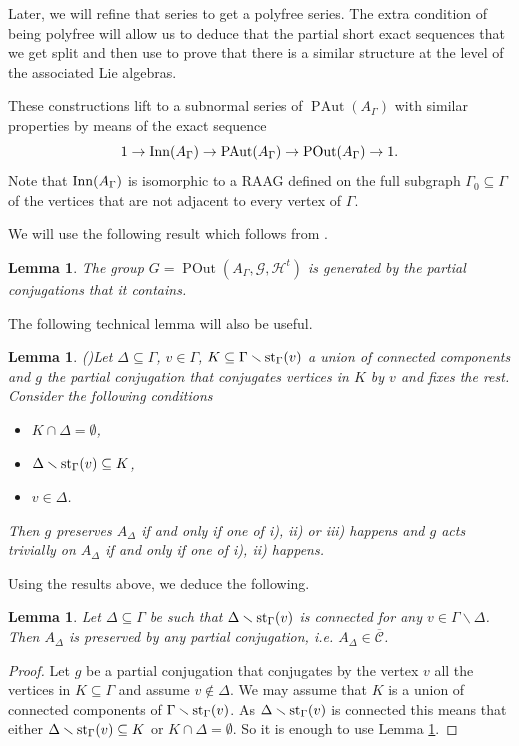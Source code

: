\documentclass[10pt]{amsart}
\newtheorem{lemma}[theorem]{Lemma}
\theoremstyle{definition}
\newcommand{\Inn}{{\rm Inn}}
\newcommand{\st}{{\rm st}}
\newcommand{\PAut}{\operatorname{PAut}}
\newcommand{\POut}{\operatorname {POut}}
\theoremstyle{definition}
\numberwithin{equation}{section}
\begin{document}
  Later, we will refine that series to get a polyfree series. The extra condition of being polyfree will allow us to deduce that the partial short exact sequences that we get split and then use \cite{FalkRandell} to prove that there is a similar structure at the level of the associated Lie algebras.
  
  These constructions lift to a subnormal series of $\PAut(A_\Gamma)$ with similar properties by means of the exact sequence
  \[ 1 \to \Inn(A_\Gamma) \to \PAut(A_\Gamma) \to \POut(A_\Gamma) \to 1.\]
  Note that $\Inn(A_\Gamma)$ is isomorphic to a RAAG defined on the full subgraph $\Gamma_0 \subseteq \Gamma$ of the vertices that are not adjacent to every vertex of $\Gamma$.



  We will use the following result which follows from \cite[Theorem D]{DayWade}.
  
  \begin{lemma}\label{lem:generating} The group $G=\POut(A_\Gamma,\mathcal{G},\mathcal{H}^t)$ is generated by the partial conjugations that it contains.
   \end{lemma}
   
   The following technical lemma will also be useful.
   
   \begin{lemma}(\cite[Lemma 2.2(3)]{DayWade})\label{DayWade2.2}
   Let $\Delta\subseteq\Gamma$, $v\in\Gamma$, $K\subseteq\Gamma\smallsetminus\st_\Gamma(v)$ a union of connected components and $g$ the partial conjugation that conjugates vertices in $K$ by $v$ and fixes the rest.  Consider the following conditions
   \begin{itemize}
   \item[i)] $K\cap\Delta=\emptyset$,
   \item[ii)] $\Delta\smallsetminus\st_\Gamma(v)\subseteq K$,
   \item[iii)] $v\in\Delta$.
   \end{itemize}
   Then $g$ preserves $A_\Delta$ if and only if one of i), ii) or iii) happens and $g$ acts trivially on $A_\Delta$ if and only if one of i), ii) happens.
   \end{lemma}

   Using the results above,  we deduce the following.
   
   \begin{lemma}\label{condinv} Let $\Delta\subseteq\Gamma$ be such that $\Delta\smallsetminus\st_\Gamma(v)$ is connected for any $v\in\Gamma\smallsetminus\Delta$. Then $A_\Delta$ is preserved by any partial conjugation, i.e. $A_\Delta\in\overline{\mathcal{C}}$.
   \end{lemma}
   \begin{proof} Let $g$ be a partial conjugation that conjugates by the vertex $v$ all the vertices in $K\subseteq\Gamma$ and assume $v\not\in\Delta$. We may assume that $K$ is a union of connected components of $\Gamma\smallsetminus\st_\Gamma(v)$. As $\Delta\smallsetminus\st_\Gamma(v)$ is connected this means that either $\Delta\smallsetminus\st_\Gamma(v)\subseteq K$ or $K\cap\Delta=\emptyset$. So it is enough to use Lemma \ref{DayWade2.2}.
   \end{proof}
   
\end{document}
